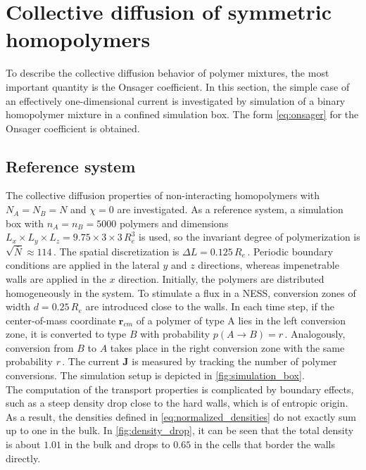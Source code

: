 \documentclass[bachelor,       %
               oneside,        %
               BCOR10mm,       %
               ngerman, english %
               ]{GAUBM}
\begin{document}
\chapter{Collective diffusion of symmetric homopolymers}
\label{chap:colldiff}

To describe the collective diffusion behavior of polymer mixtures, the most important quantity is the Onsager coefficient. In this section, the simple case of an effectively one-dimensional current is investigated by simulation of a binary homopolymer mixture in a confined simulation box. The form \autoref{eq:onsager} for the Onsager coefficient is obtained. 

\section{Reference system}

The collective diffusion properties of non-interacting homopolymers with $N_A=N_B=N$ and $\chi=0$ are investigated. As a reference system, a simulation box with $n_A=n_B=5000$ polymers and dimensions $L_x\times L_y\times L_z=9.75\times3\times3\,R_e^3$ is used, so the invariant degree of polymerization is $\sqrt{\bar{N}}\approx 114\,$. The spatial discretization is $\Delta L=0.125\,R_e\,$.  Periodic boundary conditions are applied in the lateral $y$ and $z$ directions, whereas impenetrable walls are applied in the $x$ direction. Initially, the polymers are distributed homogeneously in the system. To stimulate a flux in a \ac{NESS}, conversion zones of width $d=0.25\,R_e$ are introduced close to the walls. In each time step, if the center-of-mass coordinate $\mathbf r_{cm}$ of a polymer of type A lies in the left conversion zone, it is converted to type $B$ with probability $p(A\rightarrow B)=r\,$. Analogously, conversion from $B$ to $A$ takes place in the right conversion zone with the same probability $r\,$. The current $\mathbf J$ is measured by tracking the number of polymer conversions. The simulation setup is depicted in \autoref{fig:simulation_box}. \\
The computation of the transport properties is complicated by boundary effects, such as a steep density drop close to the hard walls, which is of entropic origin. As a result, the densities defined in \autoref{eq:normalized_densities} do not exactly sum up to one in the bulk. In \autoref{fig:density_drop}, it can be seen that the total density is about $1.01$ in the bulk and drops to $0.65$ in the cells that border the walls directly.
\end{document}
